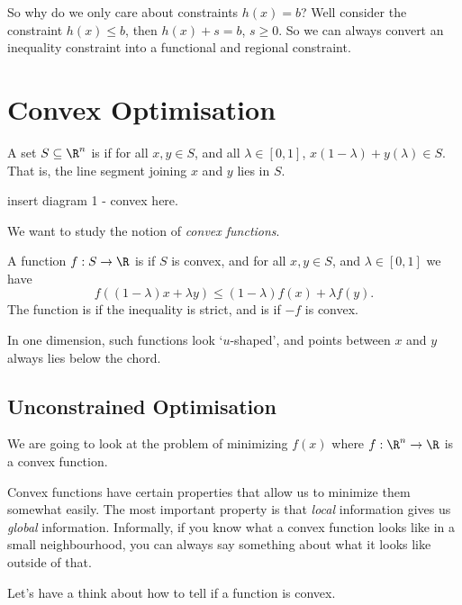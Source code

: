 \documentclass[a4paper]{scrartcl}
\begin{document}
So why do we only care about constraints $h(x) =b$? Well consider the constraint $h(x) \leq b$, then $h(x) + s = b$, $s \geq 0$. So we can always convert an inequality constraint into a functional and regional constraint.

\section{Convex Optimisation}

\begin{definition}
	A set $S \subseteq \R^n$ is  if for all $x, y \in S$, and all $\lambda \in [0, 1]$, $x(1 - \lambda) + y(\lambda) \in S$. That is, the line segment joining $x$ and $y$ lies in $S$.
\end{definition}

\begin{center}
	insert diagram 1 - convex here.
\end{center}

We want to study the notion of \emph{convex functions}.

\begin{definition}
	A function $f:S \rightarrow \R$ is  if $S$ is convex, and for all $x, y \in S$, and $\lambda \in [0, 1]$ we have
	$$
f((1 - \lambda)x + \lambda y) \leq (1 - \lambda)f(x) + \lambda f(y).
	$$
	The function is  if the inequality is strict, and is  if $-f$ is convex.
\end{definition}

In one dimension, such functions look `$u$-shaped', and points between $x$ and $y$ always lies below the chord.

\subsection{Unconstrained Optimisation}

We are going to look at the problem of minimizing $f(x)$ where $f: \R^n \rightarrow \R$ is a convex function. 

Convex functions have certain properties that allow us to minimize them somewhat easily. The most important property is that \emph{local} information gives us \emph{global} information. Informally, if you know what a convex function looks like in a small neighbourhood, you can always say something about what it looks like outside of that.

Let's have a think about how to tell if a function is convex.
\end{document}

